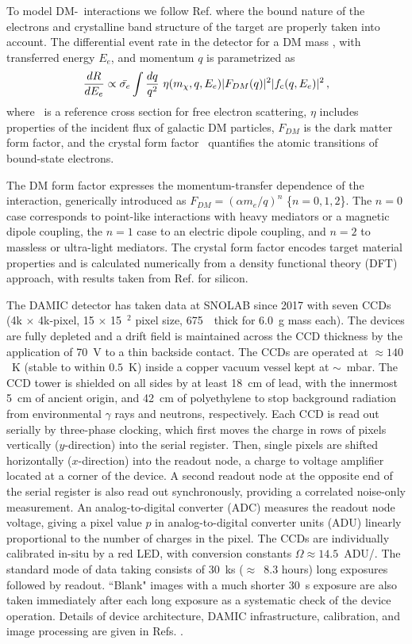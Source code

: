 \documentclass[aps,amsmath,amssymb,twocolumn,superscriptaddress,nofootinbib]{revtex4-1}
\begin{document}
To model DM-\electron\ interactions we follow Ref. \cite{essig:2016} where the bound nature of the electrons and crystalline band structure of the target are properly taken into account. The differential event rate in the detector for a DM mass \mass, with transferred energy $E_e$, and momentum $q$ is parametrized as
\begin{equation} \label{eq:rate}
\frac{dR}{dE_e} \propto  \bar{\sigma_e} \int \frac{dq}{q^2}~\eta(m_\chi,q,E_e) |F_{DM}(q)|^2 |f_\textnormal{c}(q,E_e)|^2\,,
\end{equation} 
where \sige\ is a reference cross section for free electron scattering, $\eta$ includes properties of the incident flux of galactic DM particles, $F_{DM}$ is the dark matter form factor, and the crystal form factor \crystal\ quantifies the atomic transitions of bound-state electrons.

The DM form factor expresses the momentum-transfer dependence of the interaction, generically introduced as $F_{DM}=(\alpha m_e/q)^n$ \{$n=0,1,2$\}. The $n=0$ case corresponds to point-like interactions with heavy mediators or a magnetic dipole coupling, the $n=1$ case to an electric dipole coupling, and $n=2$ to massless or ultra-light mediators. The crystal form factor encodes target material properties and is calculated numerically from a density functional theory (DFT) approach, with results taken from Ref. \cite{essig:2016} for silicon.

The DAMIC detector has taken data at SNOLAB since 2017 with seven CCDs (4k $\times$ 4k-pixel, 15 $\times$ 15~\um$^2$ pixel size, 675~\um~thick for 6.0~g mass each). The devices are fully depleted and a drift field is maintained across the CCD thickness by the application of 70~V to a thin backside contact. The CCDs are operated at $\approx140$~K (stable to within $0.5$~K) inside a copper vacuum vessel kept at $\sim$~mbar. The CCD tower is shielded on all sides by at least 18~cm of lead, with the innermost 5~cm of ancient origin, and 42~cm of polyethylene to stop background radiation from environmental $\gamma$ rays and neutrons, respectively. Each CCD is read out serially by three-phase clocking, which first moves the charge in rows of pixels vertically ($y$-direction) into the serial register. Then, single pixels are shifted horizontally ($x$-direction) into the readout node, a charge to voltage amplifier located at a corner of the device. A second readout node at the opposite end of the serial register is also read out synchronously, providing a correlated noise-only measurement. An analog-to-digital converter (ADC) measures the readout node voltage, giving a pixel value $p$ in analog-to-digital converter units (ADU) linearly proportional to the number of charges in the pixel. The CCDs are individually calibrated in-situ by a red LED, with conversion constants $\Omega \approx 14.5$~ADU/\electron. The standard mode of data taking consists of 30~ks ($\approx$~8.3 hours) long exposures followed by readout. ``Blank" images with a much shorter 30~s exposure are also taken immediately after each long exposure as a systematic check of the device operation. Details of device architecture, DAMIC infrastructure, calibration, and image processing are given in Refs. \cite{Aguilar-Arevalo:2016, aguilar:2017}.
\end{document}
